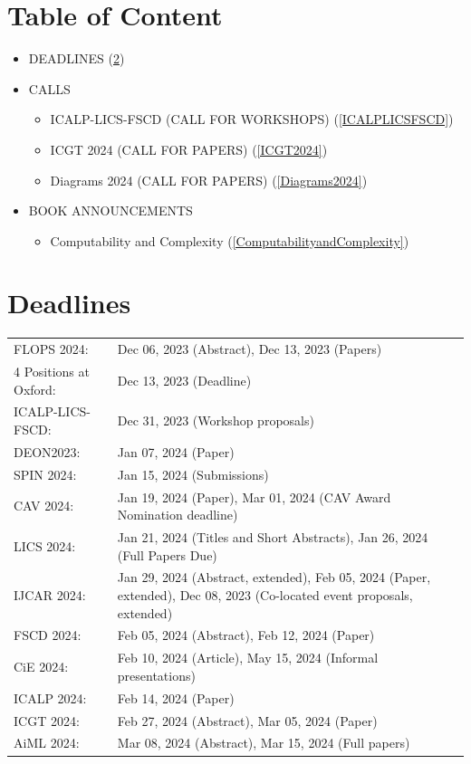 \documentclass[prodmode,acmtecs]{acmsmall} %
\begin{document}
\section{Table of Content}\begin{itemize}\item DEADLINES (\cref{deadlines}) 
 
\item CALLS 
 
\begin{itemize}\item ICALP-LICS-FSCD (CALL FOR WORKSHOPS) (\cref{ICALPLICSFSCD})
\item ICGT 2024 (CALL FOR PAPERS) (\cref{ICGT2024})
\item Diagrams 2024 (CALL FOR PAPERS) (\cref{Diagrams2024})
\end{itemize} 
\item BOOK ANNOUNCEMENTS 
 
\begin{itemize}\item Computability and Complexity (\cref{ComputabilityandComplexity})
\end{itemize} 
\end{itemize}\section{Deadlines}\label{deadlines}\begin{tabulary}{\linewidth}{LL}FLOPS 2024:  & Dec 06, 2023 (Abstract), Dec 13, 2023 (Papers) \\
4 Positions at Oxford:  & Dec 13, 2023 (Deadline) \\
ICALP-LICS-FSCD:  & Dec 31, 2023 (Workshop proposals) \\
DEON2023:  & Jan 07, 2024 (Paper) \\
SPIN 2024:  & Jan 15, 2024 (Submissions) \\
CAV 2024:  & Jan 19, 2024 (Paper), Mar 01, 2024 (CAV Award Nomination deadline) \\
LICS 2024:  & Jan 21, 2024 (Titles and Short Abstracts), Jan 26, 2024 (Full Papers Due) \\
IJCAR 2024:  & Jan 29, 2024 (Abstract, extended), Feb 05, 2024 (Paper, extended), Dec 08, 2023 (Co-located event proposals, extended) \\
FSCD 2024:  & Feb 05, 2024 (Abstract), Feb 12, 2024 (Paper) \\
CiE 2024:  & Feb 10, 2024 (Article), May 15, 2024 (Informal presentations) \\
ICALP 2024:  & Feb 14, 2024 (Paper) \\
ICGT 2024:  & Feb 27, 2024 (Abstract), Mar 05, 2024 (Paper) \\
AiML 2024:  & Mar 08, 2024 (Abstract), Mar 15, 2024 (Full papers) \\
\end{tabulary}
\end{document}

